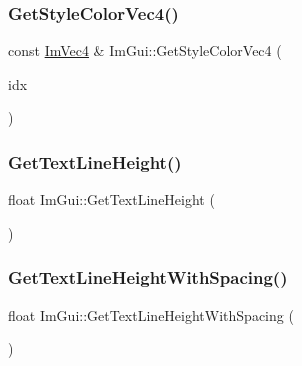 \hypertarget{namespace_im_gui_ad838e580972e2c4b3da2b0f60754b662}{}\label{namespace_im_gui_ad838e580972e2c4b3da2b0f60754b662} 
\subsubsection{\texorpdfstring{Get\+Style\+Color\+Vec4()}{GetStyleColorVec4()}}
{\footnotesize\ttfamily const \hyperlink{struct_im_vec4}{Im\+Vec4} \& Im\+Gui\+::\+Get\+Style\+Color\+Vec4 (\begin{DoxyParamCaption}\item[{Im\+Gui\+Col}]{idx }\end{DoxyParamCaption})}

\hypertarget{namespace_im_gui_aaba5637199d31ea23d4d143b30a44aff}{}\label{namespace_im_gui_aaba5637199d31ea23d4d143b30a44aff} 
\subsubsection{\texorpdfstring{Get\+Text\+Line\+Height()}{GetTextLineHeight()}}
{\footnotesize\ttfamily float Im\+Gui\+::\+Get\+Text\+Line\+Height (\begin{DoxyParamCaption}{ }\end{DoxyParamCaption})}

\hypertarget{namespace_im_gui_aa1616f6082fd210fde8d98c511bf8f56}{}\label{namespace_im_gui_aa1616f6082fd210fde8d98c511bf8f56} 
\subsubsection{\texorpdfstring{Get\+Text\+Line\+Height\+With\+Spacing()}{GetTextLineHeightWithSpacing()}}
{\footnotesize\ttfamily float Im\+Gui\+::\+Get\+Text\+Line\+Height\+With\+Spacing (\begin{DoxyParamCaption}{ }\end{DoxyParamCaption})}

\hypertarget{namespace_im_gui_ab8d8a7a9e1a0e84e636202ec74733db9}{}\label{namespace_im_gui_ab8d8a7a9e1a0e84e636202ec74733db9} 
